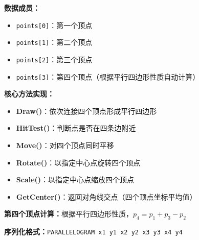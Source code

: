 \documentclass[12pt,a4paper]{article}
\begin{document}
\begin{tcolorbox}
\textbf{数据成员：}
\begin{itemize}
    \item \texttt{points[0]}：第一个顶点
    \item \texttt{points[1]}：第二个顶点
    \item \texttt{points[2]}：第三个顶点
    \item \texttt{points[3]}：第四个顶点（根据平行四边形性质自动计算）
\end{itemize}

\textbf{核心方法实现：}
\begin{itemize}
    \item \textbf{Draw()}：依次连接四个顶点形成平行四边形
    \item \textbf{HitTest()}：判断点是否在四条边附近
    \item \textbf{Move()}：对四个顶点同时平移
    \item \textbf{Rotate()}：以指定中心点旋转四个顶点
    \item \textbf{Scale()}：以指定中心点缩放四个顶点
    \item \textbf{GetCenter()}：返回对角线交点（四个顶点坐标平均值）
\end{itemize}

\textbf{第四个顶点计算：}根据平行四边形性质，$p_4 = p_1 + p_3 - p_2$

\textbf{序列化格式：}\texttt{PARALLELOGRAM x1 y1 x2 y2 x3 y3 x4 y4}
\end{tcolorbox}
\end{document}
